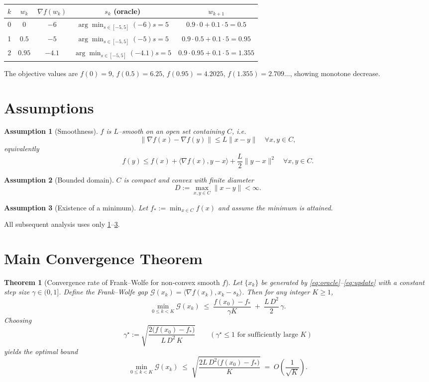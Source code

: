 \documentclass{article}
\newtheorem{theorem}{Theorem}
\newtheorem{assumption}{Assumption}
\newcommand{\gap}{\mathcal{G}}
\newcommand{\diam}{D}
\begin{document}
\begin{center}
\begin{tabular}{c|c|c|c|c}
$k$ & $w_k$ & $\nabla f(w_k)$ & $s_k$ (oracle) & $w_{k+1}$\\\hline
0 & $0$ & $-6$ & $\displaystyle\arg\min_{s\in[-5,5]}(-6)s = 5$ & $0.9\cdot0+0.1\cdot5=0.5$\\
1 & $0.5$ & $-5$ & $\displaystyle\arg\min_{s\in[-5,5]}(-5)s = 5$ & $0.9\cdot0.5+0.1\cdot5=0.95$\\
2 & $0.95$ & $-4.1$ & $\displaystyle\arg\min_{s\in[-5,5]}(-4.1)s = 5$ & $0.9\cdot0.95+0.1\cdot5=1.355$\\
\end{tabular}
\end{center}
The objective values are $f(0)=9$, $f(0.5)=6.25$, $f(0.95)=4.2025$, $f(1.355)=2.709\ldots$, showing monotone decrease.

\newpage
\section*{Assumptions}
\begin{assumption}[Smoothness]\label{ass:smooth}
$f$ is $L$–smooth on an open set containing $C$, i.e.
\[
\|\nabla f(x)-\nabla f(y)\|\le L\|x-y\|\quad\forall x,y\in C,
\]
equivalently
\[
f(y)\le f(x)+\langle\nabla f(x),y-x\rangle+\frac{L}{2}\|y-x\|^2\quad\forall x,y\in C.
\]
\end{assumption}

\begin{assumption}[Bounded domain]\label{ass:diam}
$C$ is compact and convex with finite diameter
\[
\diam:=\max_{x,y\in C}\|x-y\|<\infty .
\]
\end{assumption}

\begin{assumption}[Existence of a minimum]\label{ass:opt}
Let $f_*:=\min_{x\in C}f(x)$ and assume the minimum is attained.
\end{assumption}

All subsequent analysis uses only \ref{ass:smooth}–\ref{ass:opt}.

\section*{Main Convergence Theorem}
\begin{theorem}[Convergence rate of Frank–Wolfe for non‑convex smooth $f$]\label{thm:main}
Let $\{x_k\}$ be generated by \eqref{eq:oracle}–\eqref{eq:update} with a \emph{constant} step size $\gamma\in(0,1]$.
Define the Frank–Wolfe gap $\gap(x_k)=\langle\nabla f(x_k),x_k-s_k\rangle$.
Then for any integer $K\ge1$,
\[
\min_{0\le k<K}\gap(x_k)\;\le\;
\frac{f(x_0)-f_*}{\gamma K}\;+\;\frac{L\,\diam^2}{2}\,\gamma .
\tag{1}
\]
Choosing
\[
\gamma^\star:=\sqrt{\frac{2\bigl(f(x_0)-f_*\bigr)}{L\,\diam^2\,K}}
\qquad (\gamma^\star\le 1\text{ for sufficiently large }K)
\]
yields the \emph{optimal} bound
\[
\min_{0\le k<K}\gap(x_k)\;\le\;
\sqrt{\frac{2L\,\diam^2\bigl(f(x_0)-f_*\bigr)}{K}}
\;=\;O\!\left(\frac{1}{\sqrt{K}}\right).
\tag{2}
\]
\end{theorem}
\end{document}
